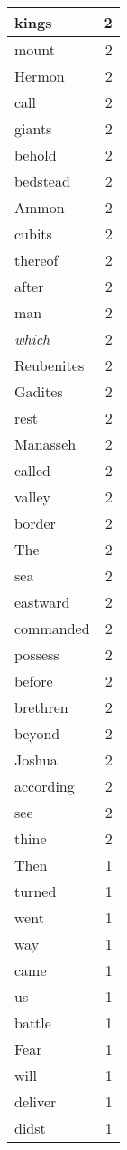 \begin{center}
\begin{longtable}{l|r}
kings & 2 \\ \hline
mount & 2 \\ \hline
Hermon & 2 \\ \hline
call & 2 \\ \hline
giants & 2 \\ \hline
behold & 2 \\ \hline
bedstead & 2 \\ \hline
Ammon & 2 \\ \hline
cubits & 2 \\ \hline
thereof & 2 \\ \hline
after & 2 \\ \hline
man & 2 \\ \hline
\emph{which} & 2 \\ \hline
Reubenites & 2 \\ \hline
Gadites & 2 \\ \hline
rest & 2 \\ \hline
Manasseh & 2 \\ \hline
called & 2 \\ \hline
valley & 2 \\ \hline
border & 2 \\ \hline
The & 2 \\ \hline
sea & 2 \\ \hline
eastward & 2 \\ \hline
commanded & 2 \\ \hline
possess & 2 \\ \hline
before & 2 \\ \hline
brethren & 2 \\ \hline
beyond & 2 \\ \hline
Joshua & 2 \\ \hline
according & 2 \\ \hline
see & 2 \\ \hline
thine & 2 \\ \hline
Then & 1 \\ \hline
turned & 1 \\ \hline
went & 1 \\ \hline
way & 1 \\ \hline
came & 1 \\ \hline
us & 1 \\ \hline
battle & 1 \\ \hline
Fear & 1 \\ \hline
will & 1 \\ \hline
deliver & 1 \\ \hline
didst & 1 \\ \hline

\end{longtable}
\end{center}
